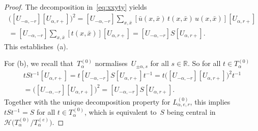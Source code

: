\documentclass{amsart}
\theoremstyle{remark}
\theoremstyle{definition}
\newcommand*{\R}{\mathbb R}%
\newcommand*{\Un}{U}%
\newcommand*{\Hecke}{\mathcal H}%
\begin{document}
\begin{proof}
  The decomposition in~\eqref{eq:xxyty} yields
  \begin{multline}
    \bigl( [\Un_{-\alpha,-r}] [\Un_{\alpha,r+}] \bigr)^2 = [\Un_{-\alpha,-r}]
    \sum_{x,\bar{x}} [\bar{u}(x,\bar{x}) \, t(x,\bar{x}) \, u(x,\bar{x}) ] [\Un_{\alpha,r+}] \\
    = [\Un_{-\alpha,-r}] \sum_{x,\bar{x}} [t(x,\bar{x}) ] [\Un_{\alpha,r+}] =
    [\Un_{-\alpha,-r}] S [\Un_{\alpha,r+}].
  \end{multline}
  This establishes~(a).

  For (b), we recall that~\(T_\alpha^{(0)}\) normalises~\(\Un_{\pm \alpha,s}\) for all \(s \in \R\).  So for all \(t \in T_\alpha^{(0)}\)
  \begin{multline}
    [\Un_{-\alpha,-r}] t S t^{-1} [\Un_{\alpha,r+}]
    = t [\Un_{-\alpha,-r}] S [\Un_{\alpha,r+}] t^{-1}
    = t \bigl( [\Un_{-\alpha,-r}] [\Un_{\alpha,r+}] \bigr)^2 t^{-1}
    \\= \bigl( [\Un_{-\alpha,-r}] [\Un_{\alpha,r+}] \bigr)^2
    = [\Un_{-\alpha,-r}] S [\Un_{\alpha,r+}].
  \end{multline}
  Together with the unique decomposition property for \(L^{(0)}_{\alpha,e,r}\), this implies \(t S t^{-1} = S\) for all \(t \in T_\alpha^{(0)}\), which is equivalent to~\(S\) being central in \(\Hecke \bigl( T_\alpha^{(0)} / T_\alpha^{(e)} \bigr)\).


\end{proof}
\end{document}
